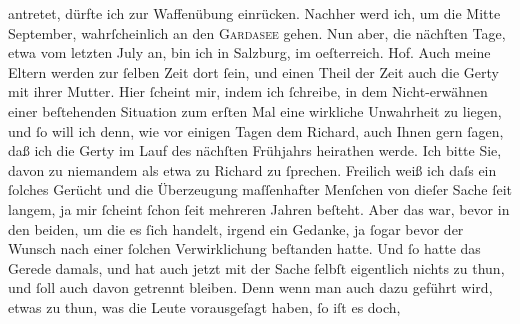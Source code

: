 \begin{ledgroupsized}[t]{13cm}
{{{               }}}\label{K_L01061-1h} antretet, dürfte ich zur Waffenübung einrücken. Nachher werd ich, um die
                  Mitte September, wahrſcheinlich an den \textsc{Gardasee} gehen.\pend
           \pstart
           Nun aber, die nächſten Tage, etwa vom letzten July an, bin ich in Salzburg, im oeſterreich. Hof. Auch meine Eltern werden zur ſelben Zeit dort ſein, und einen Theil
               der Zeit auch die {\pb}Gerty mit ihrer Mutter.\pend
           \pstart
           Hier ſcheint mir, indem ich ſchreibe, in dem Nicht-erwähnen einer beſtehenden
               Situation zum erſten Mal eine wirkliche Unwahrheit zu liegen, und ſo will ich denn,
               wie vor einigen Tagen dem Richard, auch Ihnen
               gern ſagen, daß ich die Gerty im Lauf des
               nächſten Frühjahrs heirathen werde. Ich bitte Sie, davon zu niemandem als etwa {\pb}zu Richard zu ſprechen. Freilich weiß ich daſs ein ſolches Gerücht
               und die Überzeugung maſſenhafter Menſchen von dieſer Sache ſeit langem, ja mir
               ſcheint ſchon ſeit mehreren Jahren beſteht. Aber das war, bevor in den beiden, um die
               es ſich handelt, irgend ein Gedanke, ja ſogar bevor der Wunsch nach einer ſolchen
               Verwirklichung beſtanden hatte. Und ſo hatte das Gerede damals, und hat auch jetzt
                  {\pb}mit der Sache ſelbſt
               eigentlich nichts zu thun, und ſoll auch davon getrennt bleiben. Denn wenn man auch
               dazu geführt wird, etwas zu thun, was die Leute vorausgeſagt haben, ſo iſt es doch,

\end{ledgroupsized}
